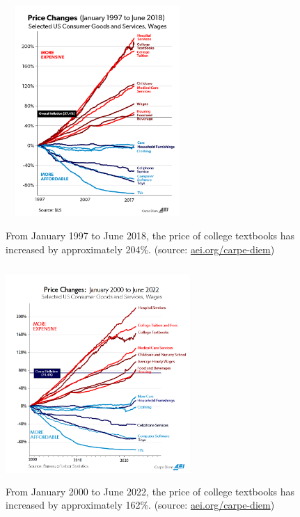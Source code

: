 \documentclass[11pt]{article}
\theoremstyle{theorem}
\theoremstyle{definition}
\begin{document}
\begin{figure}[h!]
\begin{minipage}[t]{8.0cm}
\includegraphics[width=70mm,height=80mm]{cpichart2018a.png}
\caption{\small From January 1997 to June 2018, the price of college textbooks has increased by approximately 204\%. (source: \href{aei.org/carpe-diem}{aei.org/carpe-diem}) }\label{fig:cpi-textbooks-2018}
\end{minipage}
\hfill
\begin{minipage}[t]{8.0cm}
\includegraphics[width=70mm,height=82mm]{cpi2022junea-3.png}
\caption{\small From January 2000 to June 2022, the price of college textbooks has increased by approximately 162\%. (source: \href{aei.org/carpe-diem}{aei.org/carpe-diem})}\label{fig:cpi-textbooks-2022}
\end{minipage}

\end{figure}



\end{document}
